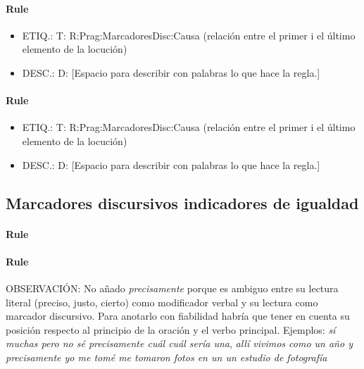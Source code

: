 \documentclass[11pt]{report}
\begin{document}
\paragraph*{Rule}
\begin{itemize}
\item ETIQ.:  T: R:Prag:MarcadoresDisc:Causa (relación entre el primer i el último elemento de la locución)
\item DESC.:  D: [Espacio para describir con palabras lo que hace la regla.]
\end{itemize}

\paragraph*{Rule}
\begin{itemize}
\item ETIQ.:  T: R:Prag:MarcadoresDisc:Causa (relación entre el primer i el último elemento de la locución)
\item DESC.:  D: [Espacio para describir con palabras lo que hace la regla.]
\end{itemize}

\subsection{Marcadores discursivos indicadores de igualdad}
\paragraph*{Rule}
\paragraph*{Rule}
OBSERVACIÓN: No añado \emph{precisamente} porque es ambiguo entre su lectura literal (preciso, justo, cierto) como modificador verbal y su lectura como marcador discursivo. Para anotarlo con fiabilidad habría que tener en cuenta su posición respecto al principio de la oración y el verbo principal. Ejemplos: \emph{sí muchas pero no sé precisamente cuál cuál sería una}, \emph{allí vivimos como un año y precisamente yo me tomé me tomaron fotos en un un estudio de fotografía}
\end{document}
